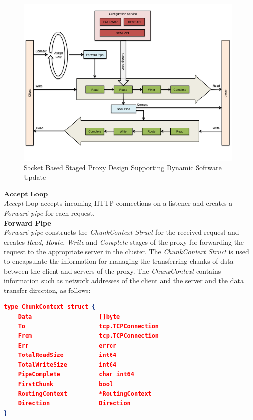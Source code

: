 \documentclass[a4paper,11pt,twoside]{article}
\begin{document}
\begin{figure}[!ht]
  \centering
     \includegraphics[scale=0.60]{proxy}
  \caption{Socket Based Staged Proxy Design Supporting Dynamic Software Update}
  \label{proxy}
\end{figure}

\noindent
\textbf{Accept Loop} \\
 \textit{Accept} loop accepts incoming HTTP connections on a listener and creates a  \textit{Forward pipe} for each request.\\  

\noindent
\textbf{Forward Pipe} \\
\textit{Forward pipe} constructs the \textit{ChunkContext Struct} for the received request and creates \textit{Read}, \textit{Route}, \textit{Write} and \textit{Complete} stages of the proxy for forwarding the request to the appropriate server in the cluster. The \textit{ChunkContext Struct} is used to encapsulate the information for managing the transferring chunks of data between the client and servers of the proxy. The \textit{ChunkContext} contains information such as network addresses of the client and the server and the data transfer direction, as follows: \\ 

\begin{lstlisting}[language=json,firstnumber=1]
type ChunkContext struct {
	Data                   []byte
	To                     tcp.TCPConnection
	From                   tcp.TCPConnection
	Err                    error
	TotalReadSize          int64
	TotalWriteSize         int64
	PipeComplete           chan int64
	FirstChunk             bool
	RoutingContext         *RoutingContext
	Direction              Direction
}
\end{lstlisting} 
\end{document}
